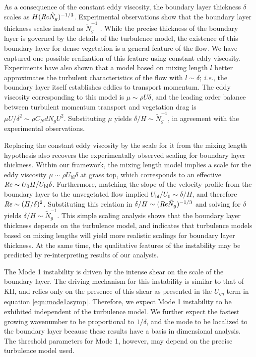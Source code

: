 \documentclass{jfm}
\newcommand{\Ndg}{\tilde{N}_g}
\newcommand{\ubl}{U_\text{bl}}
\newcommand{\ReyNdg}{{\Rey\Ndg}}
\begin{document}
As a consequence of the constant eddy viscosity, the boundary layer thickness $\delta$ scales as $H(\ReyNdg)^{-1/3}$.
Experimental observations show that the boundary layer thickness scales instead as $\Ndg^{-1}$ \citep{Nepf07}.
While the precise thickness of the boundary layer is governed by the details of the turbulence model, the existence of this boundary layer for dense vegetation is a general feature of the flow. 
We have captured one possible realization of this feature using constant eddy viscosity.
Experiments have also shown that a model based on mixing length $l$ better approximates the turbulent characteristics of the flow with $l \sim \delta$; \textit{i.e.}, the boundary layer itself establishes eddies to transport momentum. 
The eddy viscosity corresponding to this model is $\mu \sim \rho U \delta$, and the leading order balance between turbulent momentum transport and vegetation drag is $\mu U/\delta^2 \sim \rho C_N d N_g U^2$.
Substituting $\mu$ yields $\delta/H \sim \Ndg^{-1}$, in agreement with the experimental observations.

Replacing the constant eddy viscosity by the scale for it from the mixing length hypothesis also recovers the experimentally observed scaling for boundary layer thickness.
Within our framework, the mixing length model implies a scale for the eddy viscosity $\mu \sim \rho \ubl \delta$ at grass top, which corresponds to an effective $\Rey \sim U_0H/\ubl \delta$.
Furthermore, matching the slope of the velocity profile from the boundary layer to the unvegetated flow implied $\ubl/U_0 \sim \delta/H$, and therefore $\mbox{\textit{Re}} \sim (H/\delta)^2$.
Substituting this relation in $\delta/H \sim (\Rey \Ndg)^{-1/3}$ and solving for $\delta$ yields $\delta/H \sim \Ndg^{-1}$.
This simple scaling analysis shows that the boundary layer thickness depends on the turbulence model, and indicates that turbulence models based on mixing lengths will yield more realistic scalings for boundary layer thickness.
At the same time, the qualitative features of the instability may be predicted by re-interpreting results of our analysis.

The Mode 1 instability is driven by the intense shear on the scale of the boundary layer.
The driving mechanism for this instability is similar to that of KH, and relies only on the presence of this shear as presented in the $U_{\eta\eta}$ term in equation \eqref{eqn:mode1asymp}. 
Therefore, we expect Mode 1 instability to be exhibited independent of the turbulence model. 
We further expect the fastest growing wavenumber to be proportional to $1/\delta$, and the mode to be localized to the boundary layer because these results have a basis in dimensional analysis.
The threshold parameters for Mode 1, however, may depend on the precise turbulence model used.
 
\end{document}
